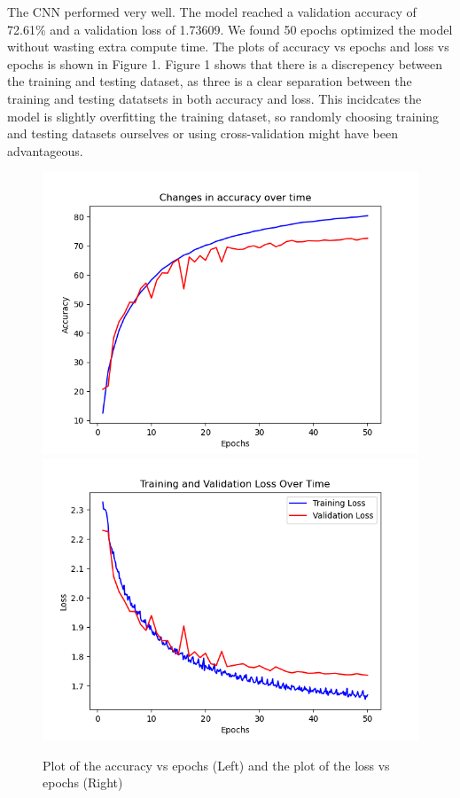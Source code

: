 \documentclass[letterpaper, 12pt]{article}
\begin{document}
The CNN performed very well.  The model reached a validation accuracy of 72.61\% and a validation loss of 1.73609. We found 50 epochs optimized the model without wasting extra compute time. The plots of accuracy vs epochs and loss vs epochs is shown in Figure 1. Figure 1 shows that there is a discrepency between the training and testing dataset, as three is a clear separation between the training and testing datatsets in both accuracy and loss. This incidcates the model is slightly overfitting the training dataset, so randomly choosing training and testing datasets ourselves or using cross-validation might have been advantageous.

\begin{figure}[H]
\centering
\includegraphics[scale = 0.5]{accuracy}
\includegraphics[scale = 0.5]{loss}
\caption{Plot of the accuracy vs epochs (Left) and the plot of the loss vs epochs (Right)}
\end{figure}
\end{document}
